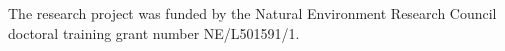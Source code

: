\afterabstract
%
%
%
The research project was funded by the Natural Environment Research Council doctoral training grant number NE/L501591/1.
\afterpreface
